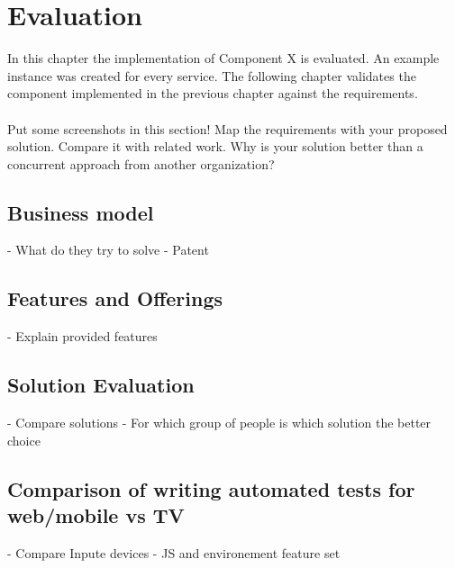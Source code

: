 \chapter{Evaluation\label{cha:chapter6}}

In this chapter the implementation of Component X is evaluated. An example instance was
created for every service. The following chapter validates the component implemented in
the previous chapter against the requirements.\\
\\
Put some screenshots in this section! Map the requirements with your proposed solution.
Compare it with related work. Why is your solution better than a concurrent approach from
another organization?

\section{Business model\label{sec:businessmodel}}

- What do they try to solve
- Patent

\section{Features and Offerings\label{sec:features}}

- Explain provided features

\section{Solution Evaluation\label{sec:usab}}

- Compare solutions
- For which group of people is which solution the better choice

\section{Comparison of writing automated tests for web/mobile vs TV\label{sec:diffInWritingTests}}

- Compare Inpute devices
- JS and environement feature set
